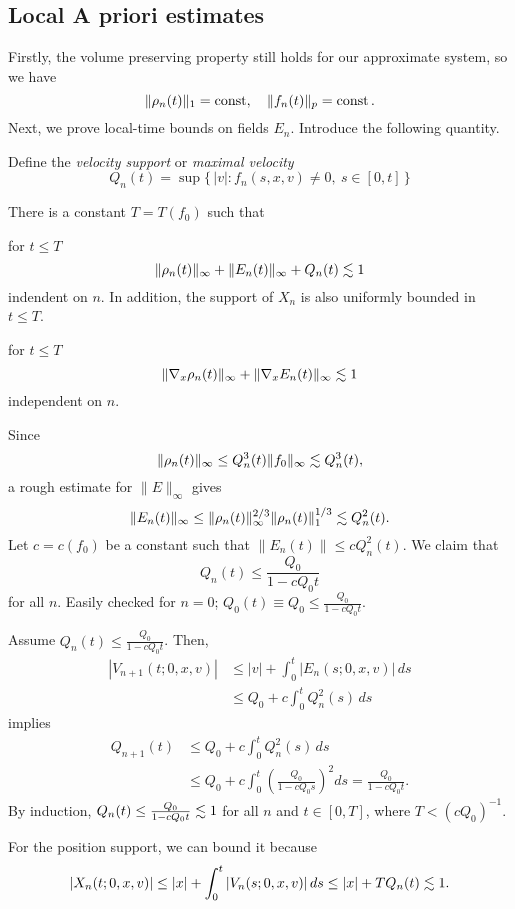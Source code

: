 \documentclass[11pt]{amsart}
\begin{document}
\subsection{Local A priori estimates}

Firstly, the volume preserving property still holds for our approximate system, so we have
\[\|\rho_n(t)\|_1=\operatorname{const},\quad\|f_n(t)\|_p=\operatorname{const}.\]
Next, we prove local-time bounds on fields $E_n$.
Introduce the following quantity.
\begin{defn}
Define the \emph{velocity support} or \emph{maximal velocity}
\[Q_n(t)=\sup\{\,|v|:f_n(s,x,v)\ne0,\ s\in[0,t]\,\}\]
\end{defn}

\begin{lem}
There is a constant $T=T(f_0)$ such that
\begin{cond}
\item
for $t\le T$
\[\|\rho_n(t)\|_\infty+\|E_n(t)\|_\infty+Q_n(t)\lesssim1\]
indendent on $n$.
In addition, the support of $X_n$ is also uniformly bounded in $t\le T$.
\item
for $t\le T$
\[\|\nabla_x\rho_n(t)\|_\infty+\|\nabla_xE_n(t)\|_\infty\lesssim1\]
independent on $n$.
\end{cond}
\end{lem}
\begin{pfs}
\item
Since
\[\|\rho_n(t)\|_\infty\le Q_n^3(t)\|f_0\|_\infty\lesssim Q_n^3(t),\]
a rough estimate for $\|E\|_\infty$ gives
\[\|E_n(t)\|_\infty\le\|\rho_n(t)\|_\infty^{2/3}\|\rho_n(t)\|_1^{1/3}\lesssim Q_n^2(t).\]
Let $c=c(f_0)$ be a constant such that $\|E_n(t)\|\le cQ_n^2(t)$.
We claim that
\[Q_n(t)\le\frac{Q_0}{1-cQ_0t}\]
for all $n$.
Easily checked for $n=0$; $Q_0(t)\equiv Q_0\le\frac{Q_0}{1-cQ_0t}$.

Assume $Q_n(t)\le\frac{Q_0}{1-cQ_0t}$.
Then,
\begin{align*}
|V_{n+1}(t;0,x,v)|
&\le|v|+\int_0^t|E_n(s;0,x,v)|\,ds\\
&\le Q_0+c\int_0^tQ_n^2(s)\,ds
\end{align*}
implies
\begin{align*}
Q_{n+1}(t)
&\le Q_0+c\int_0^tQ_n^2(s)\,ds\\
&\le Q_0+c\int_0^t\left(\frac{Q_0}{1-cQ_0s}\right)^2ds
=\frac{Q_0}{1-cQ_0t}.
\end{align*}
By induction, $Q_n(t)\le\frac{Q_0}{1-cQ_0t}\lesssim1$ for all $n$ and $t\in[0,T]$, where $T<(cQ_0)^{-1}$.

For the position support, we can bound it because
\[|X_n(t;0,x,v)|\le|x|+\int_0^t|V_n(s;0,x,v)|\,ds\le|x|+TQ_n(t)\lesssim1.\]
\item
\qedhere
\end{pfs}
\end{document}
